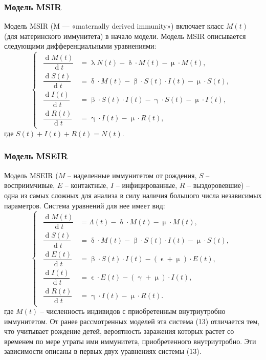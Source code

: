 \documentclass[a4paper, 12pt]{extarticle}
\numberwithin{equation}{section}
\renewcommand{\beta}{\upbeta}
\renewcommand{\gamma}{\upgamma}
\renewcommand{\delta}{\updelta}
\renewcommand{\lambda}{\uplambda}
\renewcommand{\mu}{\upmu}
\renewcommand{\d}{\operatorname{d}}
\renewcommand{\epsilon}{\upvarepsilon}
\begin{document}
	\subsubsection{Модель MSIR}
	Модель MSIR (M — «maternally derived immunity») включает класс $M(t)$ (для материнского иммунитета) в начало модели. Модель MSIR описывается следующими дифференциальными уравнениями:
	\begin{equation}
		\left\{ 
		\begin{gathered} 
			\begin{aligned}
				\dfrac {\d M(t)}{\d t} &= \lambda N(t) - \delta\cdot M(t)-\mu\cdot M(t),\\
				\dfrac {\d S(t)}{\d t} &= \delta \cdot M(t) -\beta\cdot S(t)\cdot I(t) - \mu \cdot S(t),\\
				\dfrac{\d I(t)}{\d t} &=\beta\cdot S(t)\cdot I(t) - \gamma \cdot S(t) - \mu \cdot I(t),\\
				\dfrac{\d R(t)}{\d t} &= \gamma\cdot I(t) - \mu \cdot R(t), 
			\end{aligned}
		\end{gathered} 
		\right.
	\end{equation}
	где $S(t) + I(t) + R(t) = N(t).$
	\subsubsection{Модель MSEIR}
	Модель MSEIR ($M$ -- наделенные иммунитетом от рождения, $S$ -- восприимчивые, $E$ -- контактные, $I$ -- инфицированные, $R$ -- выздоровевшие) -- одна из самых сложных для анализа в силу наличия большого числа независимых параметров. Система уравнений для нее имеет вид:
	\begin{equation}
		\left\{ 
		\begin{gathered} 
			\begin{aligned}
				\dfrac {\d M(t)}{\d t} &= \Lambda(t) - \delta\cdot M(t)-\mu\cdot M(t),\\
				\dfrac {\d S(t)}{\d t} &= \delta \cdot M(t) -\beta\cdot S(t)\cdot I(t) - \mu \cdot S(t),\\
				\dfrac {\d E(t)}{\d t} &= \beta \cdot S(t)\cdot I(t) - (\epsilon + \mu)\cdot E(t),\\
				\dfrac{\d I(t)}{\d t} &=\epsilon \cdot E(t) - (\gamma + \mu)\cdot I(t),\\
				\dfrac{\d R(t)}{\d t} &= \gamma\cdot I(t) - \mu \cdot R(t). 
			\end{aligned}
		\end{gathered} 
		\right.
	\end{equation}
	где $M (t)$ -- численность индивидов с приобретенным внутриутробно иммунитетом. От ранее рассмотренных моделей эта система (13) отличается тем, что учитывает рождение детей, вероятность заражения которых растет со временем по мере утраты ими иммунитета, приобретенного внутриутробно. Эти зависимости описаны в первых двух уравнениях системы (13).
	
\end{document}

